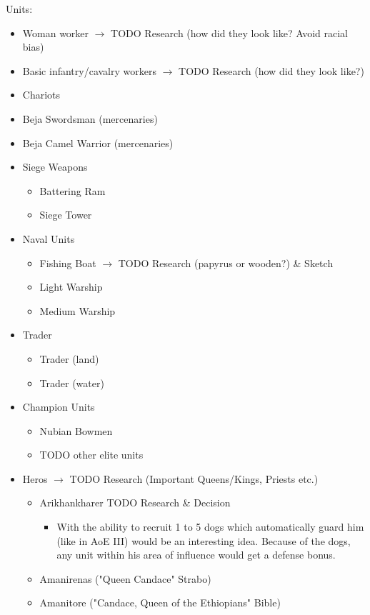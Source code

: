 \documentclass[a4paper,12pt]{scrreprt}
\begin{document}
Units:

\begin{itemize}
	\item Woman worker $\rightarrow$ TODO Research (how did they look like? Avoid racial bias)
	\item Basic infantry/cavalry workers $\rightarrow$ TODO Research (how did they look like?)
	\item Chariots
	\item Beja Swordsman (mercenaries)
	\item Beja Camel Warrior (mercenaries)
	\item Siege Weapons
	\begin{itemize}
		\item Battering Ram
		\item Siege Tower
	\end{itemize}
	\item Naval Units
	\begin{itemize}
		\item Fishing Boat $\rightarrow$ TODO Research (papyrus or wooden?) \& Sketch
		\item Light Warship
		\item Medium Warship
	\end{itemize}
	\item Trader
	\begin{itemize}
		\item Trader (land)
		\item Trader (water)
	\end{itemize}
	\item Champion Units
	\begin{itemize}
		\item Nubian Bowmen
		\item TODO other elite units
	\end{itemize}
	\item Heros $\rightarrow$ TODO Research (Important Queens/Kings, Priests etc.)
	\begin{itemize}
		\item Arikhankharer TODO Research \& Decision
		\begin{itemize}
			\item With the ability to recruit 1 to 5 dogs which automatically guard him (like in AoE III) would be an interesting idea. Because of the dogs, any unit within his area of influence would get a defense bonus.  
		\end{itemize}
		\item Amanirenas ("Queen Candace" Strabo)
		\item Amanitore ("Candace, Queen of the Ethiopians" Bible)
	\end{itemize}
\end{itemize}
\end{document}

